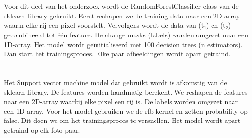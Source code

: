\section{}%
\label{sec:random-forest}
Voor dit deel van het onderzoek wordt de RandomForestClassifier class van de sklearn library gebruikt. Eerst reshapen we de training data 
naar een 2D array waarin elke rij een pixel voorstelt. Vervolgens wordt de data van (t₁) en (t₂) gecombineerd tot één feature. 
De change masks (labels) worden omgezet naar een 1D-array. Het model wordt geïnitialiseerd met 100 decision trees (n estimators). 
Dan start het trainingsproces. Elke paar afbeeldingen wordt apart getraind.
\newline
\newline

\section{}%
\label{sec:svm}
Het Support vector machine model dat gebruikt wordt is afkomstig van de sklearn library. De features worden handmatig berekent. 
We reshapen de features naar een 2D-array waarbij elke pixel een rij is. De labels worden omgezet naar een 1D-array. Voor het model gebruiken we 
de rfb kernel en zetten probability op false. Dit doen we om het trainingsproces te versnellen. Het model wordt apart getraind op elk foto paar.
\newline
\newline

